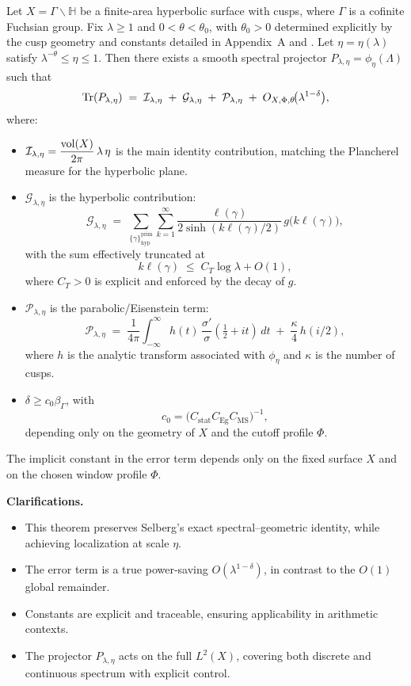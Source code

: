 \begin{theorem}\label{thm:intro-localized-trace}
Let $X=\Gamma\backslash\mathbb{H}$ be a finite-area hyperbolic surface with cusps,
where $\Gamma$ is a cofinite Fuchsian group.
Fix $\lambda\ge 1$ and $0<\theta<\theta_0$, with $\theta_0>0$ determined explicitly
by the cusp geometry and constants detailed in Appendix~A and .
Let $\eta=\eta(\lambda)$ satisfy $\lambda^{-\theta}\le \eta\le 1$.
Then there exists a smooth spectral projector $P_{\lambda,\eta}=\phi_\eta(\Lambda)$
such that
\[
  \operatorname{Tr}(P_{\lambda,\eta})
  \;=\;
  \mathcal{I}_{\lambda,\eta}
  \;+\;
  \mathcal{G}_{\lambda,\eta}
  \;+\;
  \mathcal{P}_{\lambda,\eta}
  \;+\;
  O_{X,\Phi,\theta}\!\big(\lambda^{1-\delta}\big),
\]
where:
\begin{itemize}
  \item $\mathcal{I}_{\lambda,\eta} = \dfrac{\operatorname{vol}(X)}{2\pi}\,\lambda\,\eta$
        is the main identity contribution, matching the Plancherel measure
        for the hyperbolic plane.
  \item $\mathcal{G}_{\lambda,\eta}$ is the hyperbolic contribution:
  \[
    \mathcal{G}_{\lambda,\eta}
    \;=\;
    \sum_{\{\gamma\}^{\mathrm{prim}}_{\mathrm{hyp}}}
    \sum_{k=1}^\infty
    \frac{\ell(\gamma)}{2\sinh(k\ell(\gamma)/2)}\,
    g\!\big(k\ell(\gamma)\big),
  \]
  with the sum effectively truncated at
  \[
    k\ell(\gamma)\;\leq\; C_T\log\lambda + O(1),
  \]
  where $C_T>0$ is explicit and enforced by the decay of $g$.
  \item $\mathcal{P}_{\lambda,\eta}$ is the parabolic/Eisenstein term:
  \[
    \mathcal{P}_{\lambda,\eta}
    \;=\;
    \frac{1}{4\pi}\int_{-\infty}^{\infty}
      h(t)\,\frac{\sigma'}{\sigma}(\tfrac{1}{2}+it)\,dt
    \;+\;
    \frac{\kappa}{4}\,h(i/2),
  \]
  where $h$ is the analytic transform associated with $\phi_\eta$
  and $\kappa$ is the number of cusps.
  \item $\delta \geq c_0 \beta_\Gamma$, with
        \[
          c_0 = \big(C_{\mathrm{stat}} C_{\mathrm{Eg}} C_{\mathrm{MS}}\big)^{-1},
        \]
        depending only on the geometry of $X$ and
        the cutoff profile $\Phi$.
\end{itemize}
The implicit constant in the error term depends only on the fixed surface $X$
and on the chosen window profile $\Phi$.
\end{theorem}

\medskip

\noindent\textbf{Clarifications.}
\begin{itemize}
  \item This theorem preserves Selberg’s exact spectral–geometric identity,
        while achieving localization at scale $\eta$.
  \item The error term is a true power-saving $O(\lambda^{1-\delta})$,
        in contrast to the $O(1)$ global remainder.
  \item Constants are explicit and traceable, ensuring applicability in arithmetic contexts.
  \item The projector $P_{\lambda,\eta}$ acts on the full $L^2(X)$,
        covering both discrete and continuous spectrum with explicit control.
\end{itemize}

